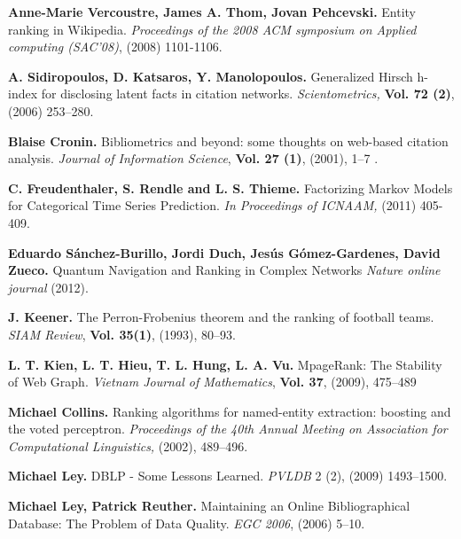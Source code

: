 \documentclass[10pt,leqno,twoside]{article}
\begin{document}
\vspace{-3ex}
\begin{thebibliography}{99}
\setlength{\parskip}{-3pt}\vspace{-2ex}

\textbf{Anne-Marie Vercoustre, James A. Thom, Jovan Pehcevski.} 
Entity ranking in Wikipedia.
\textit{Proceedings of the 2008 ACM symposium on Applied computing (SAC'08)},
(2008) 1101-1106.

\textbf{A. Sidiropoulos, D. Katsaros, Y. Manolopoulos.} 
Generalized Hirsch h-index for disclosing latent facts in citation networks. 
\textit{Scientometrics,} \textbf{Vol. 72 (2)}, (2006) 253--280.

\textbf{Blaise Cronin.}
Bibliometrics and beyond: some thoughts on web-based citation analysis. 
\textit{Journal of Information Science},
\textbf{Vol. 27 (1)}, (2001), 1--7 .


\textbf{C. Freudenthaler, S. Rendle and L. S. Thieme.} 
Factorizing Markov Models for Categorical Time Series Prediction. 
\textit{In Proceedings of ICNAAM, } (2011) 405-409.

\textbf{Eduardo Sánchez-Burillo, Jordi Duch, Jesús Gómez-Gardenes, David Zueco.}
Quantum Navigation and Ranking in Complex Networks
\textit{Nature online journal} (2012).




\textbf{J. Keener.} 
The Perron-Frobenius theorem and the ranking of football teams.  
\textit{SIAM Review}, \textbf{Vol. 35(1)}, (1993), 80--93.

\textbf{L. T. Kien, L. T. Hieu, T. L. Hung, L. A. Vu.}
MpageRank: The Stability of Web Graph.
\textit{Vietnam Journal of Mathematics}, \textbf{Vol. 37}, (2009), 475--489 

\textbf{Michael Collins.} 
Ranking algorithms for named-entity extraction: boosting and the voted perceptron. 
\textit{Proceedings of the 40th Annual Meeting on Association for Computational Linguistics,} 
(2002), 489--496.


\textbf{Michael Ley.} 
DBLP - Some Lessons Learned. 
\textit{PVLDB} 2 (2), (2009) 1493--1500.



\textbf{Michael Ley, Patrick Reuther.} 
Maintaining an Online Bibliographical Database: The Problem of Data Quality. 
\textit{EGC 2006}, (2006) 5--10.





\end{thebibliography}
\end{document}
